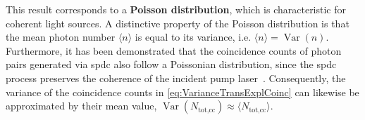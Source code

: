 This result corresponds to a \textbf{Poisson distribution}, which is characteristic for coherent light sources. A distinctive property of the Poisson distribution is that the mean photon number $\langle n \rangle$ is equal to its variance, i.e. $\langle n \rangle = \operatorname{Var}(n)$. \newline
Furthermore, it has been demonstrated that the coincidence counts of photon pairs generated via \acrshort{spdc} also follow a Poissonian distribution, since the \acrshort{spdc} process preserves the coherence of the incident pump laser~\cite{avenhausPhotonNumberStatistics2008,schneelochIntroductionAbsoluteBrightness2019,kimPhotoncountingStatisticsbasedSupport2022}. Consequently, the variance of the coincidence counts in \autoref{eq:VarianceTransExplCoinc} can likewise be approximated by their mean value, $ \operatorname{Var}(N_{\text{tot,cc}}) \approx \langle N_{\text{tot,cc}} \rangle$.

